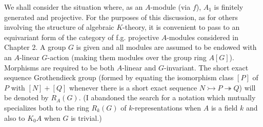 We shall consider the situation where, as an $A$-module (via $f$), $A_1$ is finitely generated and projective.
For the purposes of this discussion, as for others involving the structure of algebraic
$K$-theory, it is convenient to pass to an equivariant form of the category of f.g. projective $A$-modules considered in Chapter 2. A group $G$ is given and all modules are assumed to be
endowed with an $A$-linear $G$-action (making them modules over the group ring $A[G]$). Morphisms are required to be both $A$-linear and $G$-invariant. The short exact sequence Grothendieck group (formed by equating the isomorphism class $[P]$ of $P$ with $[N] + [Q]$ whenever there is a short exact sequence $N \rightarrowtail P \twoheadrightarrow Q$) will be denoted by $R_A(G)$. (I abandoned the search for a notation which mutually specializes both to the ring $R_k(G)$ of $k$-representations when $A$ is a field $k$ and also to $K_0A$ when $G$ is trivial.)


